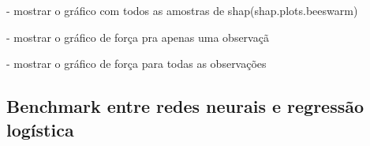 - mostrar o gráfico com todos as amostras de shap(shap.plots.beeswarm)


- mostrar o gráfico de força pra apenas uma observaçã

- mostrar o gráfico de força para todas as observações

\subsection*{Benchmark entre redes neurais e regressão logística}


\newpage


